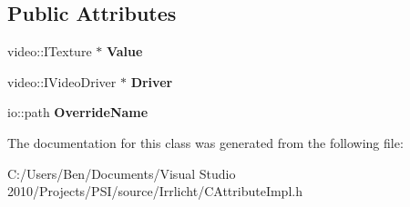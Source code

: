 \subsection*{Public Attributes}
\begin{DoxyCompactItemize}
\item 
\hypertarget{classirr_1_1io_1_1_c_texture_attribute_a5b27668a96f25e8c552ed31944f440e2}{video\-::\-I\-Texture $\ast$ {\bfseries Value}}\label{classirr_1_1io_1_1_c_texture_attribute_a5b27668a96f25e8c552ed31944f440e2}

\item 
\hypertarget{classirr_1_1io_1_1_c_texture_attribute_a89a5595ead67cbe2b8e78043976425a0}{video\-::\-I\-Video\-Driver $\ast$ {\bfseries Driver}}\label{classirr_1_1io_1_1_c_texture_attribute_a89a5595ead67cbe2b8e78043976425a0}

\item 
\hypertarget{classirr_1_1io_1_1_c_texture_attribute_a93a2be4717d7d888bc7e1e89c42a9a1e}{io\-::path {\bfseries Override\-Name}}\label{classirr_1_1io_1_1_c_texture_attribute_a93a2be4717d7d888bc7e1e89c42a9a1e}

\end{DoxyCompactItemize}


The documentation for this class was generated from the following file\-:\begin{DoxyCompactItemize}
\item 
C\-:/\-Users/\-Ben/\-Documents/\-Visual Studio 2010/\-Projects/\-P\-S\-I/source/\-Irrlicht/C\-Attribute\-Impl.\-h\end{DoxyCompactItemize}
